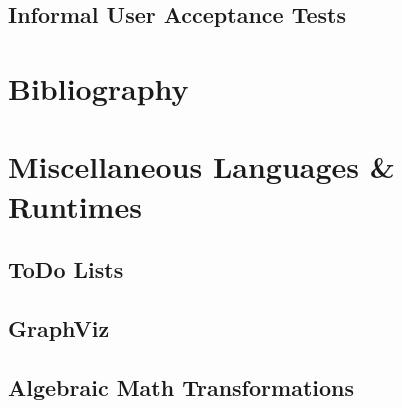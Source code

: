 \documentclass[]{report}
\begin{document}
\section{Informal User Acceptance Tests}

\appendix

\chapter{Bibliography}

\printbibliography[heading=none]

\chapter{Miscellaneous Languages \& Runtimes}

\section{ToDo Lists}

\section{GraphViz}

\section{Algebraic Math Transformations}
\end{document}
